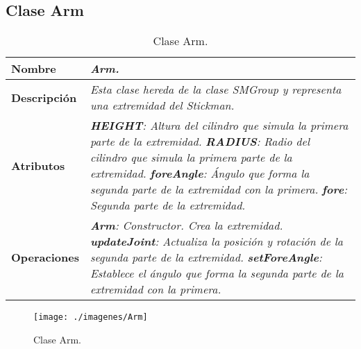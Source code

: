       \subsection{Clase Arm}
         \begin{table}[!ht] 
            \centering
            \begin{tabular}{|p{4cm}|p{11.5cm}|}
            \hline
            \textbf{Nombre} & \textit{Arm.}\\ \hline
            \textbf{Descripción} & \textit{Esta clase hereda de la clase SMGroup y representa una extremidad del Stickman.}\\ \hline
            \textbf{Atributos} & \textit{\textbf{HEIGHT}: Altura del cilindro que simula la primera parte de la extremidad.}\newline
                                 \textit{\textbf{RADIUS}: Radio del cilindro que simula la primera parte de la extremidad.}\newline
                                 \textit{\textbf{foreAngle}: Ángulo que forma la segunda parte de la extremidad con la primera.}\newline
                                 \textit{\textbf{fore}: Segunda parte de la extremidad.}\\ \hline
            \textbf{Operaciones} & \textit{\textbf{Arm}: Constructor. Crea la extremidad.}\newline
                                    \textit{\textbf{updateJoint}: Actualiza la posición y rotación de la segunda parte de la extremidad.}\newline
                                    \textit{\textbf{setForeAngle}: Establece el ángulo que forma la segunda parte de la extremidad con la primera.}\\ \hline
            \end{tabular}
            \caption{Clase Arm.}
         \end{table}
         \begin{figure} [H] \begin{center}
            \texttt{[image: ./imagenes/Arm]}\label{Arm}
            \caption{Clase Arm.}
         \end{center} \end{figure}

